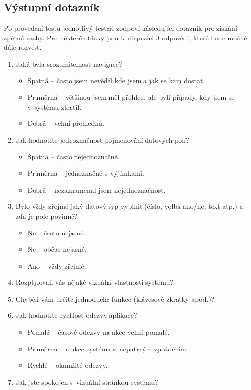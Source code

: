 \documentclass[thesis=B,czech]{FITthesis}[2012/06/26]
\begin{document}
\subsection{Výstupní dotazník}
	Po provedení testu jednotlivý testeři zodpoví následující dotazník pro získání zpětné vazby. Pro některé otázky jsou k~dispozici 3 odpovědi, které bude možné dále rozvést.
	\begin{enumerate}
		\item Jaká byla srozumitelnost navigace?
		\begin{itemize}
			\item Špatná -- často jsem nevěděl kde jsem a jak se kam dostat.
			\item Průměrná -- většinou jsem měl přehled, ale byli případy, kdy jsem se v~systému ztratil.
			\item Dobrá -- velmi přehledná.
		\end{itemize}
		\item Jak hodnotíte jednoznačnost pojmenování datových polí?
		\begin{itemize}
			\item Špatná -- často nejednoznačné.
			\item Průměrná -- jednoznačné s~výjímkami.
			\item Dobrá -- nezaznamenal jsem nejednoznačnost.
		\end{itemize}
		\item Bylo vždy zřejmé jaký datový typ vyplnit (číslo, volba ano/ne, text atp.) a zda je pole povinné?
		\begin{itemize}
			\item Ne -- často nejasné.
			\item Ne -- občas nejasné.
			\item Ano -- vždy zřejmé.
		\end{itemize}
		\item Rozptylovali vás nějaké vizuální vlastnosti systému?
		\item Chyběli vám určité jednoduché funkce (klávesové zkratky apod.)?
		\item Jak hodnotíte rychlost odezvy aplikace?
		\begin{itemize}
			\item Pomalá -- časové odezvy na akce velmi pomalé.
			\item Průměrná -- reakce systému s~nepatrným zpožděním.
			\item Rychlé -- okamžité odezvy.
		\end{itemize}
	\newpage
		\item Jak jste spokojen s~vizuální stránkou systému?

\end{enumerate}
\end{document}
